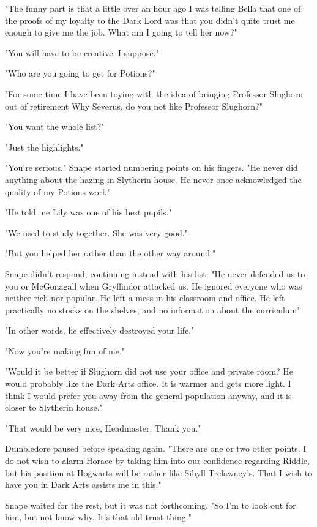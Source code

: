 "The funny part is that a little over an hour ago I was telling Bella that one of the proofs of my loyalty to the Dark Lord was that you didn't quite trust me enough to give me the job. What am I going to tell her now?"

"You will have to be creative, I suppose."

"Who are you going to get for Potions?"

"For some time I have been toying with the idea of bringing Professor Slughorn out of retirement{\el} Why Severus, do you not like Professor Slughorn?"

"You want the whole list?"

"Just the highlights."

"You're serious." Snape started numbering points on his fingers. "He never did anything about the hazing in Slytherin house. He never once acknowledged the quality of my Potions work{\el}"

"He told me Lily was one of his best pupils."

"We used to study together. She was very good."

"But you helped her rather than the other way around."

Snape didn't respond, continuing instead with his list. "He never defended us to you or McGonagall when Gryffindor attacked us. He ignored everyone who was neither rich nor popular. He left a mess in his classroom and office. He left practically no stocks on the shelves, and no information about the curriculum{\el}"

"In other words, he effectively destroyed your life."

"Now you're making fun of me."

"Would it be better if Slughorn did not use your office and private room? He would probably like the Dark Arts office. It is warmer and gets more light. I think I would prefer you away from the general population anyway, and it is closer to Slytherin house."

"That would be very nice, Headmaster. Thank you."

Dumbledore paused before speaking again. "There are one or two other points. I do not wish to alarm Horace by taking him into our confidence regarding Riddle, but his position at Hogwarts will be rather like Sibyll Trelawney's. That I wish to have you in Dark Arts assists me in this."

Snape waited for the rest, but it was not forthcoming. "So I'm to look out for him, but not know why. It's that old trust thing."

